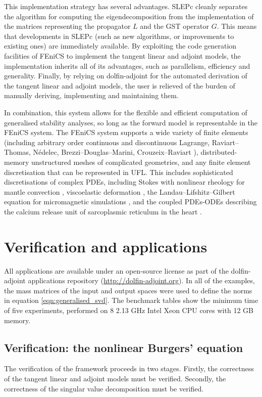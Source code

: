 \documentclass{siamltex}
\begin{document}
This implementation strategy has several advantages. SLEPc cleanly separates the algorithm for computing the
eigendecomposition from the implementation of the matrices representing the propagator $L$ and the GST
operator $G$.  This means that developments in SLEPc (such as new algorithms, or improvements to existing ones) are
immediately available.  By exploiting the code generation facilities of FEniCS to implement the tangent linear
and adjoint models, the implementation inherits all of its advantages, such as parallelism,
efficiency and generality.  Finally, by relying on dolfin-adjoint for the automated derivation of the tangent
linear and adjoint models, the user is relieved of the burden of manually deriving, implementing and
maintaining them. 

In combination, this system allows for the flexible and efficient computation of generalised
stability analyses, so long as the forward model is representable in the FEniCS system. The FEniCS system
supports a wide variety of finite elements (including arbitrary order continuous and discontinuous Lagrange, Raviart--Thomas, Nédelec,
Brezzi--Douglas--Marini, Crouzeix--Raviart \cite{kirby2004}), distributed-memory unstructured meshes of complicated geometries,
and any finite element discretisation that can be represented in UFL. This includes sophisticated
discretisations of complex PDEs, including Stokes with nonlinear rheology for mantle convection
\cite{vynnytska2013}, viscoelastic deformation \cite{rognes2010b}, the
Landau--Lifshitz--Gilbert equation for micromagnetic simulations \cite{abert2013}, and the coupled
PDEs-ODEs describing the calcium release unit of sarcoplasmic reticulum in the heart \cite{hake2013}.

\section{Verification and applications} \label{sec:examples}
All applications are available under an open-source license as part of the dolfin-adjoint applications
repository (\url{http://dolfin-adjoint.org}). In all of the examples, the mass matrices of the input
and output spaces were used to define the norms in equation \eqref{eqn:generalised_svd}.
The benchmark tables show the minimum time of five experiments, performed on 8 2.13 GHz Intel Xeon CPU cores with 12 GB memory.

\subsection{Verification: the nonlinear Burgers' equation}
The verification of the framework proceeds in two stages. Firstly, the correctness of the tangent linear
and adjoint models must be verified. Secondly, the correctness of the singular value decomposition
must be verified.
\end{document}

